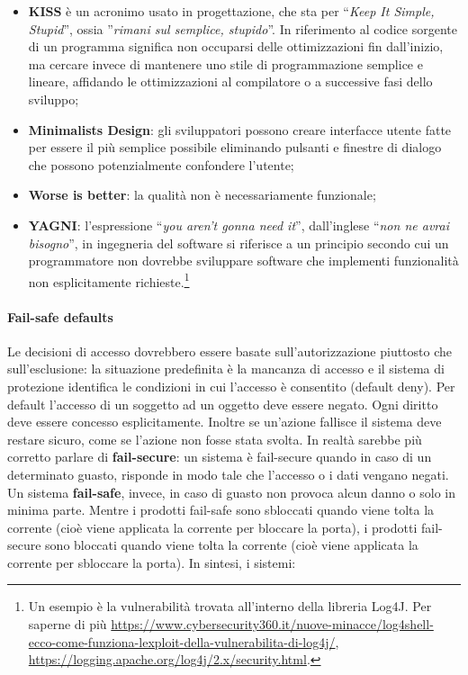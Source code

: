 \begin{itemize}
    \item \textbf{KISS} è un acronimo usato in progettazione, che sta per
          ``\textit{Keep It Simple, Stupid}'', ossia
          ''\textit{rimani sul semplice, stupido}''.
          In riferimento al codice sorgente di un programma significa
          non occuparsi delle ottimizzazioni fin dall'inizio, ma cercare invece
          di mantenere uno stile di
          programmazione semplice e lineare, affidando le ottimizzazioni al
          compilatore o a
          successive fasi dello sviluppo;
    \item \textbf{Minimalists Design}: gli sviluppatori possono creare interfacce
          utente fatte per essere il più
          semplice possibile eliminando pulsanti e finestre di dialogo che
          possono potenzialmente
          confondere l'utente;
    \item \textbf{Worse is better}: la qualità non è necessariamente funzionale;
    \item \textbf{YAGNI}: l'espressione ``\textit{you aren't gonna need it}'',
          dall'inglese ``\textit{non ne avrai bisogno}'',
          in ingegneria del software si riferisce a un principio secondo cui un
          programmatore non dovrebbe sviluppare software che implementi funzionalità non
          esplicitamente richieste.\footnote{Un esempio è la vulnerabilità
              trovata all'interno della libreria Log4J. Per saperne di più
              \url{https://www.cybersecurity360.it/nuove-minacce/log4shell-ecco-come-funziona-lexploit-della-vulnerabilita-di-log4j/},
              \url{https://logging.apache.org/log4j/2.x/security.html}.}
\end{itemize}

\paragraph{Fail-safe defaults}
Le decisioni di accesso dovrebbero essere basate sull'autorizzazione
piuttosto che sull'esclusione: la situazione predefinita è la mancanza di accesso
e il sistema
di protezione identifica le condizioni in cui l'accesso è consentito
(default deny).
Per default l'accesso di un soggetto ad un oggetto deve essere negato.
Ogni diritto deve essere concesso esplicitamente.
Inoltre se un'azione fallisce il sistema deve restare sicuro, come se
l'azione non fosse stata svolta.
In realtà sarebbe più corretto parlare di \textbf{fail-secure}: un sistema
è fail-secure quando in caso di un
determinato guasto, risponde in modo tale che l'accesso o i dati vengano negati.
Un sistema \textbf{fail-safe}, invece, in caso di guasto non provoca alcun danno
o solo in minima parte.
Mentre i prodotti fail-safe sono sbloccati quando viene tolta la corrente
(cioè viene applicata la corrente per bloccare la porta), i prodotti
fail-secure sono bloccati quando viene tolta la corrente
(cioè viene applicata la corrente per sbloccare la porta). In sintesi, i sistemi:

